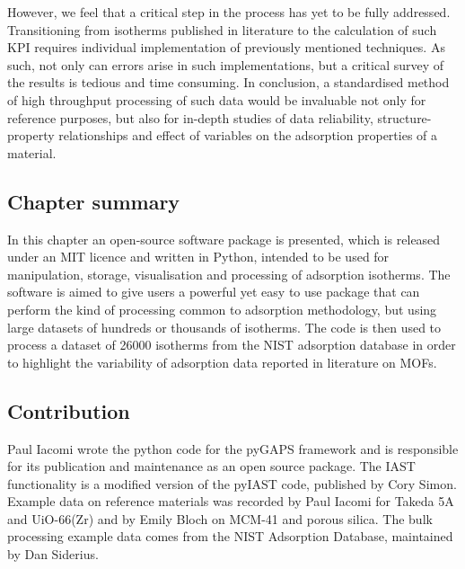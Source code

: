 However, we feel that a critical step in the process has yet
to be fully addressed. Transitioning from isotherms published in
literature to the calculation of such \gls{KPI} requires individual
implementation of previously mentioned techniques. As such,
not only can errors arise in such implementations, but
a critical survey of the results is tedious and time consuming.
In conclusion, a standardised method of high throughput processing
of such data would be invaluable not only for reference purposes,
but also for in-depth studies of data reliability,
structure-property relationships and effect of variables on
the adsorption properties of a material.

\subsection*{Chapter summary}

In this chapter an open-source software package is presented, which
is released under an MIT licence and written in Python, intended to be
used for manipulation, storage, visualisation and processing of
adsorption isotherms. The software is aimed to give users a powerful
yet easy to use package that can perform the kind of processing
common to adsorption methodology, but using large datasets of hundreds
or thousands of isotherms. The code is then used to process a
dataset of 26000 isotherms from the \gls{NIST} adsorption database in order
to highlight the variability of adsorption data reported in literature
on \glspl{MOF}.

\subsection*{Contribution}

Paul Iacomi wrote the python code for the pyGAPS framework and is
responsible for its publication and maintenance as an open source
package. The \gls{IAST} functionality is a modified version of
the pyIAST code, published by Cory Simon. Example data on reference 
materials was recorded by Paul Iacomi for Takeda 5A and UiO-66(Zr) 
and by Emily Bloch on MCM-41 and porous silica. The bulk processing
example data comes from the \gls{NIST} Adsorption Database, 
maintained by Dan Siderius.
